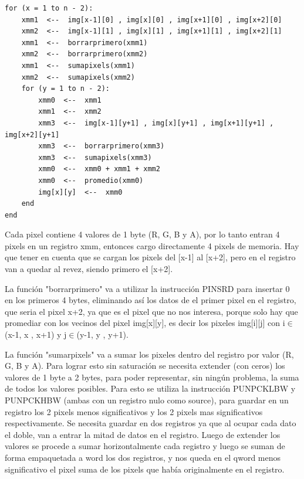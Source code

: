 \documentclass[a4paper]{article}
\begin{document}
\begin{lstlisting}
for (x = 1 to n - 2):
	xmm1  <--  img[x-1][0] , img[x][0] , img[x+1][0] , img[x+2][0]
	xmm2  <--  img[x-1][1] , img[x][1] , img[x+1][1] , img[x+2][1]
	xmm1  <--  borrarprimero(xmm1)
	xmm2  <--  borrarprimero(xmm2)
	xmm1  <--  sumapixels(xmm1)
	xmm2  <--  sumapixels(xmm2)
	for (y = 1 to n - 2): 
		xmm0  <--  xmm1
		xmm1  <--  xmm2
		xmm3  <--  img[x-1][y+1] , img[x][y+1] , img[x+1][y+1] , img[x+2][y+1]
		xmm3  <--  borrarprimero(xmm3)
		xmm3  <--  sumapixels(xmm3)
		xmm0  <--  xmm0 + xmm1 + xmm2
		xmm0  <--  promedio(xmm0)
		img[x][y]  <--  xmm0
	end
end
\end{lstlisting}

Cada pixel contiene 4 valores de 1 byte (R, G, B y A), por lo tanto entran 4 pixels en un registro xmm, entonces cargo directamente 4 pixels de memoria. Hay que tener en cuenta que se cargan los pixels del [x-1] al [x+2], pero en el registro van a quedar al revez, siendo primero el [x+2].
\newline

La función "borrarprimero" va a utilizar la instrucción PINSRD para insertar 0 en los primeros 4 bytes, eliminando así los datos de el primer pixel en el registro, que seria el pixel x+2, ya que es el pixel que no nos interesa, porque solo hay que promediar con los vecinos del pixel img[x][y], es decir los pixeles img[i][j] con i$\in$(x-1, x , x+1) y j$\in$(y-1, y , y+1).
\newline

La función "sumarpixels" va a sumar los pixeles dentro del registro por valor (R, G, B y A). Para lograr esto sin saturación se necesita extender (con ceros) los valores de 1 byte a 2 bytes, para poder representar, sin ningún problema, la suma de todos los valores posibles. Para esto se utiliza la instrucción PUNPCKLBW y PUNPCKHBW (ambas con un registro nulo como source), para guardar en un registro los 2 pixels menos significativos y los 2 pixels mas significativos respectivamente. Se necesita guardar en dos registros ya que al ocupar cada dato el doble, van a entrar la mitad de datos en el registro. Luego de extender los valores se procede a sumar horizontalmente cada registro y luego se suman de forma empaquetada a word los dos registros, y nos queda en el qword menos significativo el pixel suma de los pixels que había originalmente en el registro.
\newline
\end{document}
